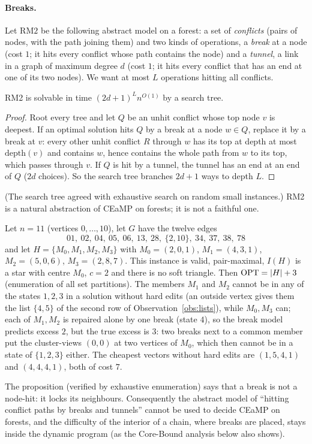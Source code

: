 \paragraph{Breaks.} Let $\mathrm{RM2}$ be the following abstract model on a forest: a set of \emph{conflicts} (pairs of nodes, with the path joining them) and two kinds of operations, a \emph{break} at a node (cost $1$; it hits every conflict whose path contains the node) and a \emph{tunnel}, a link in a graph of maximum degree $d$ (cost $1$; it hits every conflict that has an end at one of its two nodes). We want at most $L$ operations hitting all conflicts.
\begin{proposition}\label{prop:RM2}
RM2 is solvable in time $(2d+1)^{L}n^{O(1)}$ by a search tree.
\end{proposition}
\begin{proof}
Root every tree and let $Q$ be an unhit conflict whose top node $v$ is deepest. If an optimal solution hits $Q$ by a break at a node $w\in Q$, replace it by a break at $v$: every other unhit conflict $R$ through $w$ has its top at depth at most $\mathrm{depth}(v)$ and contains $w$, hence contains the whole path from $w$ to its top, which passes through $v$. If $Q$ is hit by a tunnel, the tunnel has an end at an end of $Q$ ($2d$ choices). So the search tree branches $2d+1$ ways to depth $L$.
\end{proof}
(The search tree agreed with exhaustive search on random small instances.) RM2 is a natural abstraction of CEaMP on forests; it is not a faithful one.
\begin{proposition}\label{prop:hub}
Let $n=11$ (vertices $0,\dots,10$), let $G$ have the twelve edges
\[01,\ 02,\ 04,\ 05,\ 06,\ 13,\ 28,\ \{2,10\},\ 34,\ 37,\ 38,\ 78\]
and let $H=\{M_0,M_1,M_2,M_3\}$ with $M_0=(2,0,1)$, $M_1=(4,3,1)$, $M_2=(5,0,6)$, $M_3=(2,8,7)$. This instance is valid, pair-maximal, $I(H)$ is a star with centre $M_0$, $c=2$ and there is no soft triangle. Then $\mathrm{OPT}=|H|+3$ (enumeration of all set partitions). The members $M_1$ and $M_2$ cannot be in any of the states $1,2,3$ in a solution without hard edits (an outside vertex gives them the list $\{4,5\}$ of the second row of Observation~\ref{obs:lists}), while $M_0,M_3$ can; each of $M_1,M_2$ is repaired alone by one break (state $4$), so the break model predicts excess $2$, but the true excess is $3$: two breaks next to a common member put the cluster-views $(0,0)$ at two vertices of $M_0$, which then cannot be in a state of $\{1,2,3\}$ either. The cheapest vectors without hard edits are $(1,5,4,1)$ and $(4,4,4,1)$, both of cost $7$.
\end{proposition}
The proposition (verified by exhaustive enumeration) says that a break is not a node-hit: it locks its neighbours. Consequently the abstract model of ``hitting conflict paths by breaks and tunnels'' cannot be used to decide CEaMP on forests, and the difficulty of the interior of a chain, where breaks are placed, stays inside the dynamic program (as the Core-Bound analysis below also shows).

